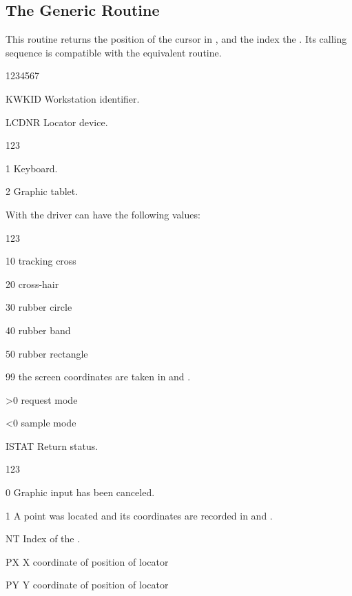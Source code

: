 \subsection{The Generic Routine}
\Action
This routine returns the  position of the cursor in \WC, and the
index the \NT. Its calling sequence is compatible with the equivalent \GKS{}
routine.
\Pdesc
\begin{DLtt}{1234567}
\item[KWKID]Workstation identifier.
\item[LCDNR]Locator device.
\begin{DLtt}{123}
\item[1] Keyboard.
\item[2] Graphic tablet.
\end{DLtt}
With the  driver  can have the following values:
\begin{DLtt}{123}
\item[10] tracking cross
\item[20] cross-hair
\item[30] rubber circle
\item[40] rubber band
\item[50] rubber rectangle
\item[99] the screen coordinates are taken in  and .
\item[>0] request mode
\item[<0] sample mode
\end{DLtt}
\item[ISTAT] Return status.
\begin{DLtt}{123}
\item[0] Graphic input has been canceled.
\item[1] A point was located and its coordinates are recorded in
 and .
\end{DLtt}
\item[NT] Index of the \NT.
\item[PX] X coordinate of position of locator
\item[PY] Y coordinate of position of locator
\end{DLtt}
 
